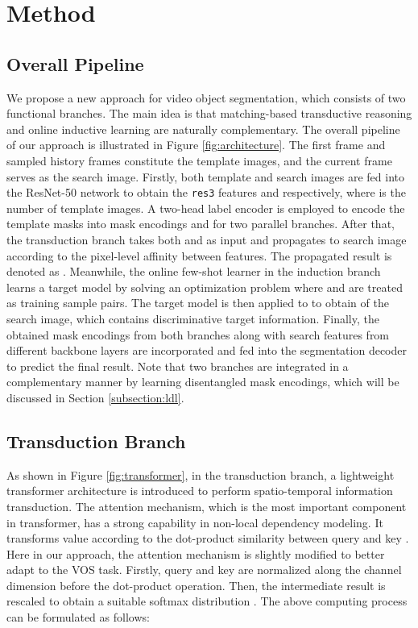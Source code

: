 \documentclass[10pt,twocolumn,letterpaper]{article}
\begin{document}
\section{Method}


\subsection{Overall Pipeline} \label{subsection:pipeline}
We propose a new approach for video object segmentation, which consists of two functional branches. The main idea is that matching-based transductive reasoning and online inductive learning are naturally complementary.
The overall pipeline of our approach is illustrated in Figure \ref{fig:architecture}. The first frame and sampled history frames constitute the template images, and the current frame serves as the search image. Firstly, both template and search images are fed into the ResNet-50 \cite{resnet2016A} network to obtain the \texttt{res3} features  and  respectively, where  is the number of template images. A two-head label encoder is employed to encode the template masks into mask encodings  and  for two parallel branches. After that, the transduction branch takes both  and  as input and propagates  to search image according to the pixel-level affinity between features. The propagated result is denoted as . Meanwhile, the online few-shot learner in the induction branch learns a target model by solving an optimization problem where  and  are treated as training sample pairs. The target model is then applied to  to obtain  of the search image, which contains discriminative target information. Finally, the obtained mask encodings from both branches along with search features from different backbone layers are incorporated and fed into the segmentation decoder to predict the final result. Note that two branches are integrated in a complementary manner by learning disentangled mask encodings, which will be discussed in Section \ref{subsection:ldl}.

\subsection{Transduction Branch} \label{subsection:mpb}
 
As shown in Figure \ref{fig:transformer}, in the transduction branch, a lightweight transformer \cite{transformer2017A} architecture is introduced to perform spatio-temporal information transduction. The attention mechanism, which is the most important component in transformer, has a strong capability in non-local dependency modeling. It transforms value  according to the dot-product similarity between query  and key . Here in our approach, the attention mechanism is slightly modified to better adapt to the VOS task. Firstly, query and key are normalized along the channel dimension before the dot-product operation. Then, the intermediate result  is rescaled to obtain a suitable softmax distribution \cite{chen2020simple,hinton2015distilling}. The above computing process can be formulated as follows:
\end{document}
